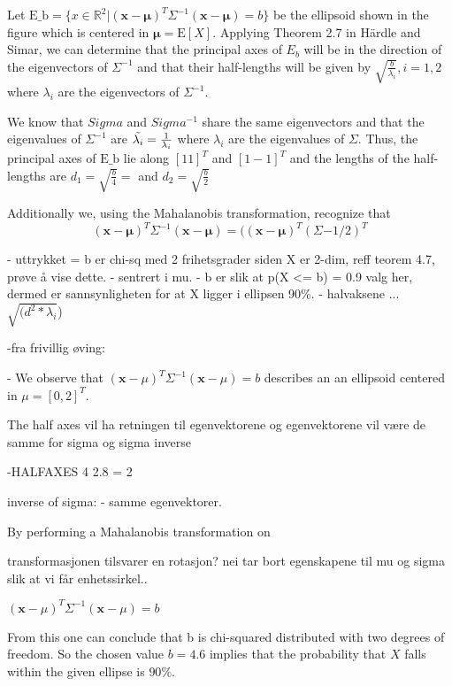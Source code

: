 
Let $\text{E_b} = \{ x \in \mathbb{R}^2|(\mathbf{x}- \mathbf{\mu})^T\Sigma^{-1} (\mathbf{x}- \mathbf{\mu}) = b \}$ be the ellipsoid shown in the figure which is centered in $\mathbf{\mu}=\text{E}[X]$. Applying Theorem 2.7 in Härdle and Simar, we can determine that the principal axes of $E_b$ will be in the direction of the eigenvectors of $\Sigma^{-1}$ and that their half-lengths will be given by $\sqrt{\frac{b}{\lambda_i}}, i =1,2$ where $\lambda_i$ are the eigenvectors of $\Sigma^{-1}$.  

We know that $Sigma$ and $Sigma^{-1}$ share the same eigenvectors and that the eigenvalues of $\Sigma^{-1}$ are  $\Tilde{\lambda_i}= \frac{1}{{\lambda_i}}$ where $\lambda_i$ are the eigenvalues of $\Sigma$. Thus, the principal axes of $\text{E_b}$ lie along $[1 1]^T$ and $[1 -1]^T$ and the lengths of the half-lengths are $d_1 = \sqrt{\frac{b}{4}} =$ and $d_2 =\sqrt{\frac{b}{2}}$ %

Additionally we, using the Mahalanobis transformation, recognize that 
\begin{equation*}
    (\mathbf{x}- \mathbf{\mu})^T\Sigma^{-1} (\mathbf{x}- \mathbf{\mu})
    = ((\mathbf{x}- \mathbf{\mu})^T(\Sigma{-1/2})^T
\end{equation*}



- uttrykket = b er chi-sq med 2 frihetsgrader siden X er 2-dim, reff teorem 4.7, prøve å vise dette. 
- sentrert i mu.
- b er slik at p(X <= b) = 0.9 valg her, dermed er sannsynligheten for at X ligger i ellipsen 90\%. 
- halvaksene ... $\sqrt{(d^2 * \lambda_i}$) 


-fra frivillig øving: 

- 
We observe that $(\textbf{x}- {\mu})^T \Sigma^{-1} (\textbf{x}-{\mu})=b$ describes an an ellipsoid centered in $\mu = [0, 2]^T$. 

The half axes vil ha retningen til egenvektorene og 
egenvektorene vil være de samme for sigma og sigma inverse 

-HALFAXES
4
2.8 = 2

inverse of sigma:
- samme egenvektorer.

By performing a Mahalanobis transformation on 

transformasjonen tilsvarer en rotasjon?
nei tar bort egenskapene til mu og sigma slik at vi får enhetssirkel..

$(\textbf{x}- {\mu})^T \Sigma^{-1} (\textbf{x}-{\mu})=b$ %

From this one can conclude that b is chi-squared distributed with two degrees of freedom. So the chosen value $b=4.6$ implies that the probability that $X$ falls within the given ellipse is $90\%$. 